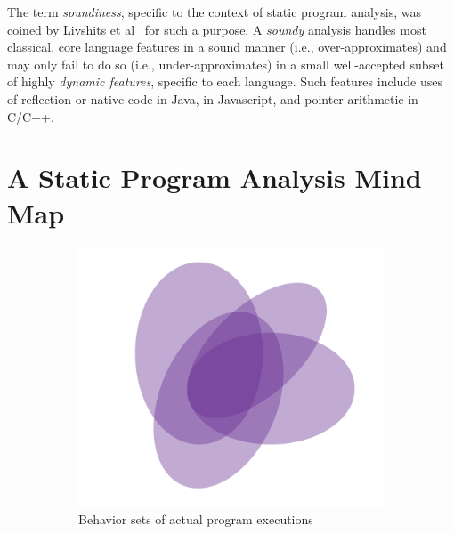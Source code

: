 The term \emph{soundiness}, specific to the context of static program analysis, was coined by Livshits et al~\cite{article:2015:Livshits} for such a purpose. A \emph{soundy} analysis handles most classical, core language features in a sound manner (i.e., over-approximates) and may only fail to do so (i.e., under-approximates) in a small well-accepted subset of highly \emph{dynamic features}, specific to each language. Such features include uses of reflection or native code in Java,  in Javascript, and pointer arithmetic in C/C++.


\section{A Static Program Analysis Mind Map}

\begin{figure}[htb!]
\begin{subfigure}{.47\textwidth}
    \includegraphics[scale=.45]{assets/background/venn-soundness-a.pdf}
    \caption{Behavior sets of actual program executions}
    \label{fig:back:soundness-a}
\end{subfigure}
\hfill
\begin{subfigure}{.47\textwidth}

\end{subfigure}
\end{figure}
